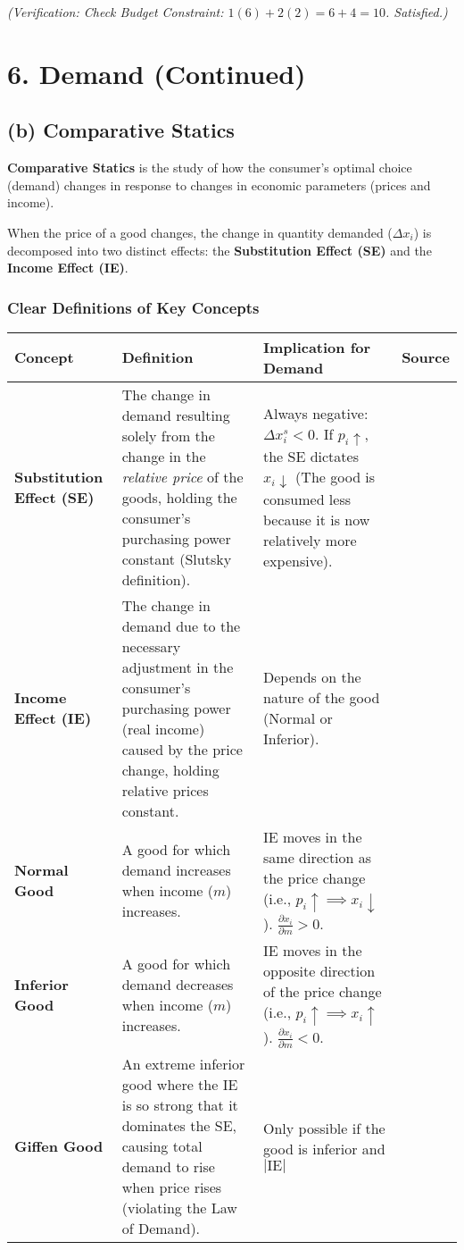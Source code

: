\documentclass{article}
\begin{document}
\vspace{0.5em}
\noindent\textit{(Verification: Check Budget Constraint: $1(6) + 2(2) = 6 + 4 = 10$. Satisfied.)}

\vspace{1em}

\section{6. Demand (Continued)}
\subsection{(b) Comparative Statics}

\textbf{Comparative Statics} is the study of how the consumer's optimal choice (demand) changes in response to changes in economic parameters (prices and income).

When the price of a good changes, the change in quantity demanded ($\Delta x_i$) is decomposed into two distinct effects: the \textbf{Substitution Effect (SE)} and the \textbf{Income Effect (IE)}.

\subsubsection*{Clear Definitions of Key Concepts}

\begin{tabular*}{\textwidth}{@{\extracolsep{\fill}} l p{} p{} l}
\toprule
\textbf{Concept} & \textbf{Definition} & \textbf{Implication for Demand} & \textbf{Source} \\
\midrule
\textbf{Substitution Effect (SE)} & The change in demand resulting solely from the change in the \textit{relative price} of the goods, holding the consumer's purchasing power constant (Slutsky definition). & Always negative: $\Delta x_i^s < 0$. If $p_i \uparrow$, the SE dictates $x_i \downarrow$ (The good is consumed less because it is now relatively more expensive). & \\
\addlinespace
\textbf{Income Effect (IE)} & The change in demand due to the necessary adjustment in the consumer's purchasing power (real income) caused by the price change, holding relative prices constant. & Depends on the nature of the good (Normal or Inferior). & \\
\addlinespace
\textbf{Normal Good} & A good for which demand increases when income ($m$) increases. & IE moves in the same direction as the price change (i.e., $p_i \uparrow \implies x_i \downarrow$). $\frac{\partial x_i}{\partial m} > 0$. & \\
\addlinespace
\textbf{Inferior Good} & A good for which demand decreases when income ($m$) increases. & IE moves in the opposite direction of the price change (i.e., $p_i \uparrow \implies x_i \uparrow$). $\frac{\partial x_i}{\partial m} < 0$. & \\
\addlinespace
\textbf{Giffen Good} & An extreme inferior good where the IE is so strong that it dominates the SE, causing total demand to rise when price rises (violating the Law of Demand). & Only possible if the good is inferior and $| \text{IE}|$ & \\
\bottomrule
\end{tabular*}
\end{document}
